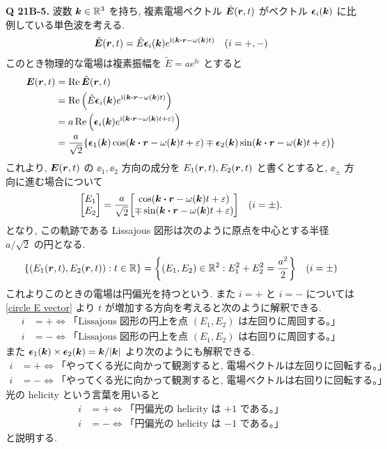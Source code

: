 \documentclass[uplatex,a4paper,dvipdfmx]{jsarticle}
\theoremstyle{definition}
\begin{document}
\textbf{Q 21B-5.} 波数 $\vb*{k}\in\mathbb{R}^3$ を持ち, 複素電場ベクトル $\tilde{\vb*{E}}(\vb*{r}, t)$ がベクトル $\vb*{\epsilon}_i(\vb*{k})$ に比例している単色波を考える.
\begin{align}
  \tilde{\EE}(\rr, t) = \tilde{E}\ee_i(\kk)e^{\ii(\kk\vdot\rr-\omega(\kk)t)} \quad (i = +, -)
\end{align}
このとき物理的な電場は複素振幅を $\tilde{E} = ae^{\ii\varepsilon}$ とすると
\begin{align}
  \EE(\rr, t) & = \Re\tilde{\EE}(\rr, t)                                                                                                                        \\
              & = \Re\qty(\tilde{E}\ee_i(\kk)e^{\ii(\kk\vdot\rr - \omega(\kk)t)})                                                                               \\
              & = a\Re\qty(\ee_i(\kk)e^{\ii(\kk\vdot\rr - \omega(\kk)t + \varepsilon)})                                                                         \\
              & = \frac{a}{\sqrt{2}}\qty{\ee_1(\kk)\cos(\kk\vdot\rr - \omega(\kk)t + \varepsilon) \mp \ee_2(\kk)\sin(\kk\vdot\rr - \omega(\kk)t + \varepsilon)}
\end{align}
これより, $\vb*{E}(\vb*{r}, t)$ の $\ee_1, \ee_2$ 方向の成分を $E_1(\vb*{r}, t), E_2(\vb*{r}, t)$ と書くとすると, $\ee_\pm$ 方向に進む場合について
\begin{equation}
  \mqty[E_1 \\ E_2] = \frac{a}{\sqrt{2}}\mqty[\cos(\kk\vdot\rr - \omega(\kk)t + \varepsilon) \\ \mp\sin(\kk\vdot\rr - \omega(\kk)t + \varepsilon)] \quad (i = \pm). \label{circle E vector}
\end{equation}
となり, この軌跡である Lissajous 図形は次のように原点を中心とする半径 $a/\sqrt{2}$ の円となる.
\begin{align}
  \qty{\qty(E_1(\vb*{r}, t), E_2(\vb*{r}, t)):t\in\mathbb{R}} = \qty{\qty(E_1, E_2)\in\mathbb{R}^2:E_1^2 + E_2^2 = \frac{a^2}{2}} \quad (i=\pm)
\end{align}
これよりこのときの電場は円偏光を持つという. また $i = +$ と $i = -$ については \eqref{circle E vector} より $t$ が増加する方向を考えると次のように解釈できる.
\begin{align}
  i & = + \iff \text{「Lissajous 図形の円上を点 $(E_1, E_2)$ は左回りに周回する。」} \\
  i & = - \iff \text{「Lissajous 図形の円上を点 $(E_1, E_2)$ は右回りに周回する。」}
\end{align}
また $\vb*{\epsilon}_1(\vb*{k})\times\vb*{\epsilon}_2(\vb*{k}) = \vb*{k}/|\vb*{k}|$ より次のようにも解釈できる.
\begin{align}
  i & = + \iff \text{「やってくる光に向かって観測すると, 電場ベクトルは左回りに回転する。」} \\
  i & = - \iff \text{「やってくる光に向かって観測すると, 電場ベクトルは右回りに回転する。」}
\end{align}
光の helicity という言葉を用いると
\begin{align}
  i & = + \iff \text{「円偏光の helicity は $+1$ である。」} \\
  i & = - \iff \text{「円偏光の helicity は $-1$ である。」}
\end{align}
と説明する.
\end{document}
